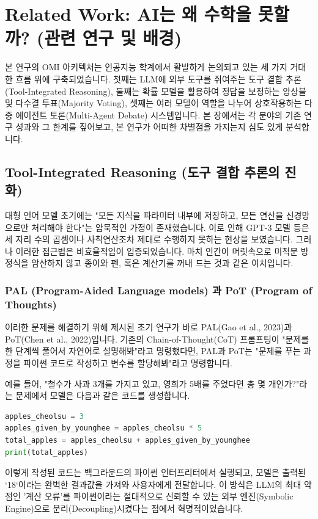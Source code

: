 \section{Related Work: AI는 왜 수학을 못할까? (관련 연구 및 배경)}

본 연구의 OMI 아키텍처는 인공지능 학계에서 활발하게 논의되고 있는 세 가지 거대한 흐름 위에 구축되었습니다. 첫째는 LLM에 외부 도구를 쥐여주는 도구 결합 추론(Tool-Integrated Reasoning), 둘째는 확률 모델을 활용하여 정답을 보정하는 앙상블 및 다수결 투표(Majority Voting), 셋째는 여러 모델이 역할을 나누어 상호작용하는 다중 에이전트 토론(Multi-Agent Debate) 시스템입니다. 본 장에서는 각 분야의 기존 연구 성과와 그 한계를 짚어보고, 본 연구가 어떠한 차별점을 가지는지 심도 있게 분석합니다.

\subsection{Tool-Integrated Reasoning (도구 결합 추론의 진화)}
대형 언어 모델 초기에는 "모든 지식을 파라미터 내부에 저장하고, 모든 연산을 신경망으로만 처리해야 한다"는 암묵적인 가정이 존재했습니다. 이로 인해 GPT-3 모델 등은 세 자리 수의 곱셈이나 사칙연산조차 제대로 수행하지 못하는 현상을 보였습니다. 그러나 이러한 접근법은 비효율적임이 입증되었습니다. 마치 인간이 머릿속으로 미적분 방정식을 암산하지 않고 종이와 펜, 혹은 계산기를 꺼내 드는 것과 같은 이치입니다.

\subsubsection{PAL (Program-Aided Language models) 과 PoT (Program of Thoughts)}
이러한 문제를 해결하기 위해 제시된 초기 연구가 바로 PAL(Gao et al., 2023)과 PoT(Chen et al., 2022)입니다. 기존의 Chain-of-Thought(CoT) 프롬프팅이 "문제를 한 단계씩 풀어서 자연어로 설명해봐"라고 명령했다면, PAL과 PoT는 "문제를 푸는 과정을 파이썬 코드로 작성하고 변수를 할당해봐"라고 명령합니다. 

예를 들어, "철수가 사과 3개를 가지고 있고, 영희가 5배를 주었다면 총 몇 개인가?"라는 문제에서 모델은 다음과 같은 코드를 생성합니다.
\begin{lstlisting}[language=Python, caption=Program-Aided Language Model 예시]
apples_cheolsu = 3
apples_given_by_younghee = apples_cheolsu * 5
total_apples = apples_cheolsu + apples_given_by_younghee
print(total_apples)
\end{lstlisting}
이렇게 작성된 코드는 백그라운드의 파이썬 인터프리터에서 실행되고, 모델은 출력된 `18`이라는 완벽한 결과값을 가져와 사용자에게 전달합니다. 이 방식은 LLM의 최대 약점인 '계산 오류'를 파이썬이라는 절대적으로 신뢰할 수 있는 외부 엔진(Symbolic Engine)으로 분리(Decoupling)시켰다는 점에서 혁명적이었습니다. 

